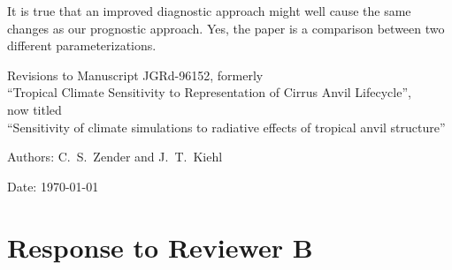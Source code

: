 \documentclass[12pt,twoside]{article}
\begin{document}
\begin{enumerate}
It is true that an improved diagnostic approach might well cause the
same changes as our prognostic approach.
Yes, the paper is a comparison between two different
parameterizations.   

\end{enumerate}

\nocite{ZeK972}



\clearpage

\setcounter{section}{1}
\setcounter{page}{1}

\begin{center}\normalsize
Revisions to Manuscript JGRd-96152, formerly \\
``Tropical Climate Sensitivity to Representation of Cirrus
Anvil Lifecycle'', \\
now titled \\
``Sensitivity of
climate simulations to radiative effects of tropical anvil structure''
\end{center}
\bigskip
\begin{center}\normalsize
Authors: C.~S.~Zender and J.~T.~Kiehl
\end{center}\normalsize
\bigskip
Date: \today
\bigskip\normalsize

\section{Response to Reviewer B}
\end{document}
